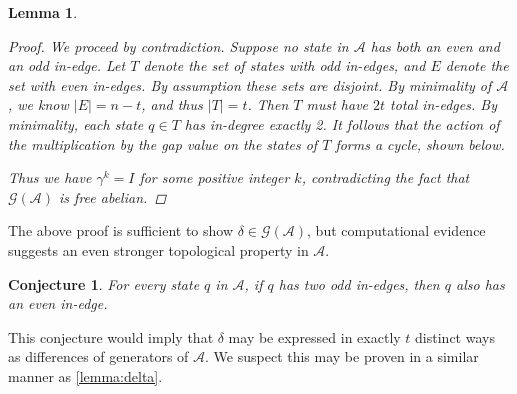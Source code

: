 \documentclass[12pt, letterpaper]{article}
\newcommand{\A}{\mathcal A}
\newcommand{\gp}{\mathcal G}
\newtheorem{lemma}[thm]{Lemma}
\newtheorem{conj}[thm]{Conjecture}
\begin{document}
\begin{lemma}
\begin{proof}
        We proceed by contradiction. Suppose no state in $\A$ has both an even
        and an odd in-edge. Let $T$ denote the set of states with odd in-edges,
        and $E$ denote the set with even in-edges. By assumption these sets are
        disjoint. By minimality of $\A$, we know $|E| = n - t$, and thus $|T| =
        t$. Then $T$ must have $2t$ total in-edges.  By minimality, each state
        $q \in T$ has in-degree exactly 2. It follows that the action of the
        multiplication by the gap value on the states of $T$ forms a cycle,
        shown below.
        \begin{center}
        \end{center}
        Thus we have $\gamma^k = I$ for some positive integer $k$, contradicting
        the fact that $\gp(\A)$ is free abelian.
    \end{proof}
\end{lemma}

The above proof is sufficient to show $\delta \in \gp(\A)$, but computational
evidence suggests an even stronger topological property in $\A$.
\begin{conj}\label{conj:no-two-toggle}
    For every state $q$ in $\A$, if $q$ has two odd in-edges, then $q$ also
    has an even in-edge.
\end{conj}
This conjecture would imply that $\delta$ may be expressed in exactly $t$
distinct ways as differences of generators of $\A$. We suspect this may
be proven in a similar manner as \cref{lemma:delta}.
\end{document}
